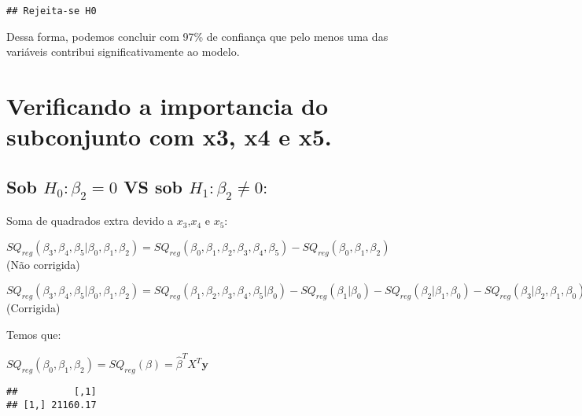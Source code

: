 \documentclass[
]{article}
\newenvironment{Shaded}{\begin{snugshade}}{\end{snugshade}}
\newcommand{\KeywordTok}[1]{\textcolor[rgb]{0.13,0.29,0.53}{\textbf{#1}}}
\newcommand{\NormalTok}[1]{#1}
\newcommand{\OperatorTok}[1]{\textcolor[rgb]{0.81,0.36,0.00}{\textbf{#1}}}
\newcommand{\StringTok}[1]{\textcolor[rgb]{0.31,0.60,0.02}{#1}}
\begin{document}
\begin{verbatim}
## Rejeita-se H0
\end{verbatim}

Dessa forma, podemos concluir com 97\% de confiança que pelo menos uma
das variáveis contribui significativamente ao modelo.

\hypertarget{verificando-a-importancia-do-subconjunto-com-x3-x4-e-x5.}{%
\section{Verificando a importancia do subconjunto com x3, x4 e
x5.}\label{verificando-a-importancia-do-subconjunto-com-x3-x4-e-x5.}}

\hypertarget{sob-h_0-ux3b2_2-0-vs-sob-h_1-ux3b2_2-neq-0}{%
\subsection{\texorpdfstring{Sob \(H_0 : β_2 = 0\) VS sob
\(H_1 : β_2 \neq 0:\)}{Sob H\_0 : β\_2 = 0 VS sob H\_1 : β\_2 \textbackslash neq 0:}}\label{sob-h_0-ux3b2_2-0-vs-sob-h_1-ux3b2_2-neq-0}}

Soma de quadrados extra devido a \(x_3\),\(x_4\) e \(x_5\):

\(SQ_{reg}(\beta_3,\beta_4,\beta_5|\beta_0,\beta_1,\beta_2) = SQ_{reg}(\beta_0,\beta_1,\beta_2,\beta_3,\beta_4,\beta_5) - SQ_{reg}(\beta_0,\beta_1,\beta_2)\)
(Não corrigida)

\(SQ_{reg}(\beta_3,\beta_4,\beta_5|\beta_0,\beta_1,\beta_2) = SQ_{reg}(\beta_1,\beta_2,\beta_3,\beta_4,\beta_5|\beta_0) - SQ_{reg}(\beta_1|\beta_0) - SQ_{reg}(\beta_2|\beta_1, \beta_0) - SQ_{reg}(\beta_3|\beta_2,\beta_1,\beta_0)- SQ_{reg}(\beta_4|\beta_3,\beta_2,\beta_1,\beta_0) - SQ_{reg}(\beta_5|\beta_4,\beta_3,\beta_2,\beta_1,\beta_0)\)
(Corrigida)

Temos que:

\(SQ_{reg}(\beta_0,\beta_1,\beta_2) = SQ_{reg}(\beta) = \widehat{\beta}^T X^T \boldsymbol{y}\)

\begin{Shaded}
\end{Shaded}

\begin{verbatim}
##          [,1]
## [1,] 21160.17
\end{verbatim}
\end{document}
